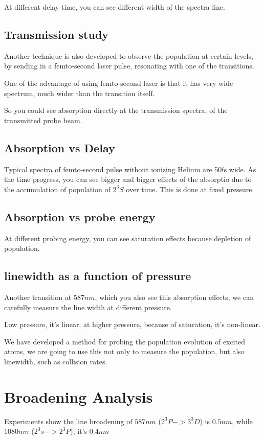 At different delay time, you can see different width of the spectra line.
\subsection{Transmission study}
Another technique is also developed to observe the population at
certain levels, by sending in a femto-second laser pulse, resonating
with one of the transitions.

One of the advantage of using femto-second laser is that it has very
wide spectrum, much wider than the transition itself.

So you could see absorption directly at the transmission spectra, of
the transmitted probe beam.

\subsection{Absorption vs Delay}
Typical spectra of femto-second pulse without ionizing Helium are 50fs
wide. As the time progress, you can see bigger and bigger effects of
the absorptio due to the accumulation of population of $2^3S$ over
time. This is done at fixed pressure.

\subsection{Absorption vs probe energy}
At different probing energy, you can see saturation effects because
depletion of population.

\subsection{linewidth as a function of pressure}
Another transition at $587nm$, which you also see this absorption
effects, we can carefully measure the line width at different
pressure.

Low pressure, it's linear, at higher pressure, because of saturation,
it's non-linear.

We have developed a method for probing the population evolution of
excited atoms, we are going to use this not only to measure the
population, but also linewidth, such as collision rates.

\section{Broadening Analysis}
Experiments show the line broadening of $587nm$ ($2^3P->3^3D$) is
$0.5nm$, while $1080nm$ ($2^3s->2^3P$), it's $0.4nm$

